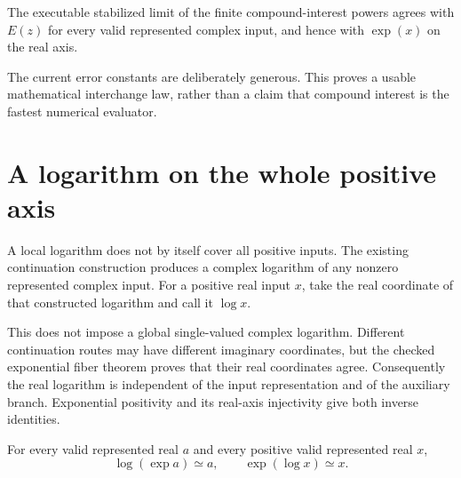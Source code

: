 \leanok

\begin{theorem}\label{thm:compound-function-agreement}
\leanok
The executable stabilized limit of the finite compound-interest powers
agrees with $E(z)$ for every valid represented complex input, and hence with
$\exp(x)$ on the real axis.
\end{theorem}

The current error constants are deliberately generous. This proves a usable
mathematical interchange law, rather than a claim that compound interest is
the fastest numerical evaluator.

\section{A logarithm on the whole positive axis}\label{sec:positive-logarithm}

A local logarithm does not by itself cover all positive inputs. The existing
continuation construction produces a complex logarithm of any nonzero
represented complex input. For a positive real input $x$, take the real
coordinate of that constructed logarithm and call it $\log x$.

This does not impose a global single-valued complex logarithm. Different
continuation routes may have different imaginary coordinates, but the
checked exponential fiber theorem proves that their real coordinates agree.
Consequently the real logarithm is independent of the input representation
and of the auxiliary branch. Exponential positivity and its real-axis
injectivity give both inverse identities.

\begin{theorem}\label{thm:global-exp-log-inverses}
\leanok
For every valid represented real $a$ and every positive valid represented
real $x$,
\[
 \log(\exp a)\simeq a,\qquad \exp(\log x)\simeq x.
\]
\end{theorem}

